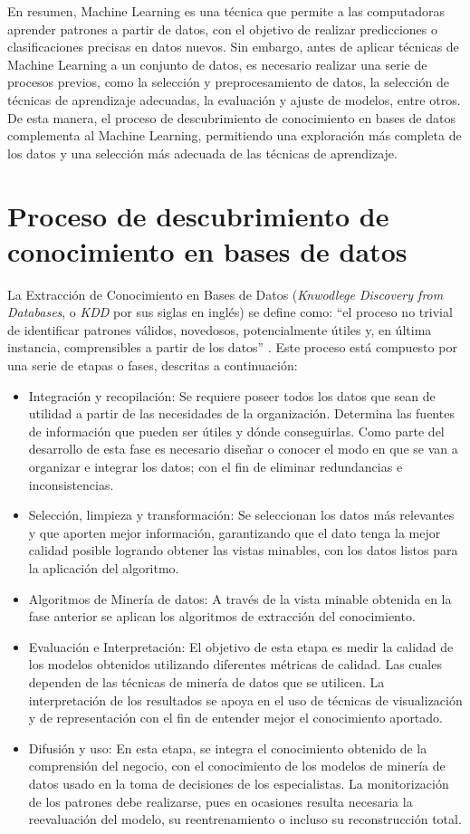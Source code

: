 En resumen, Machine Learning es una técnica que permite a las computadoras aprender patrones a partir de datos, con el objetivo de realizar predicciones o clasificaciones precisas en datos nuevos. Sin embargo, antes de aplicar técnicas de Machine Learning a un conjunto de datos, es necesario realizar una serie de procesos previos, como la selección y preprocesamiento de datos, la selección de técnicas de aprendizaje adecuadas, la evaluación y ajuste de modelos, entre otros. De esta manera, el proceso de  descubrimiento de conocimiento en bases de datos complementa al Machine Learning, permitiendo una exploración más completa de los datos y una selección más adecuada de las técnicas de aprendizaje.

\section{Proceso de descubrimiento de conocimiento en bases de datos}\label{kdd}
La Extracción de Conocimiento en Bases de Datos (\textit{Knwodlege Discovery from Databases}, o \textit{KDD} por sus siglas en inglés) se define como: “el proceso no trivial de identificar patrones válidos, novedosos, potencialmente útiles y, en última instancia, comprensibles a partir de los datos” \citep{orallo2004}. Este proceso está compuesto por una serie de etapas o fases, descritas a continuación:
\begin{itemize}
	\item Integración y recopilación: Se requiere poseer todos los datos que sean de utilidad a partir de las necesidades de la organización. Determina las fuentes de información que pueden ser útiles y dónde conseguirlas. Como parte del desarrollo de esta fase es necesario diseñar o conocer el modo en que se van a organizar e integrar los datos; con el fin de eliminar redundancias e inconsistencias.
	\item Selección, limpieza y transformación: Se seleccionan los datos más relevantes y que aporten mejor información, garantizando que el dato tenga la mejor calidad posible logrando obtener las vistas minables, con los datos listos para la aplicación del algoritmo.
	\item Algoritmos de Minería de datos: A través de la vista minable obtenida en la fase anterior se aplican los algoritmos de extracción del conocimiento.
	\item Evaluación e Interpretación: El objetivo de esta etapa es medir la calidad de los modelos obtenidos utilizando diferentes métricas de calidad. Las cuales dependen de las técnicas de minería de datos que se utilicen. La interpretación de los resultados se apoya en el uso de técnicas de visualización y de representación con el fin de entender mejor el conocimiento aportado. 
	\item Difusión y uso: En esta etapa, se integra el conocimiento obtenido de la comprensión del negocio, con el conocimiento de los modelos de minería de datos usado en la toma de decisiones de los especialistas. La monitorización de los patrones debe realizarse, pues en ocasiones resulta necesaria la reevaluación del modelo, su reentrenamiento o incluso su reconstrucción total.
\end{itemize}
